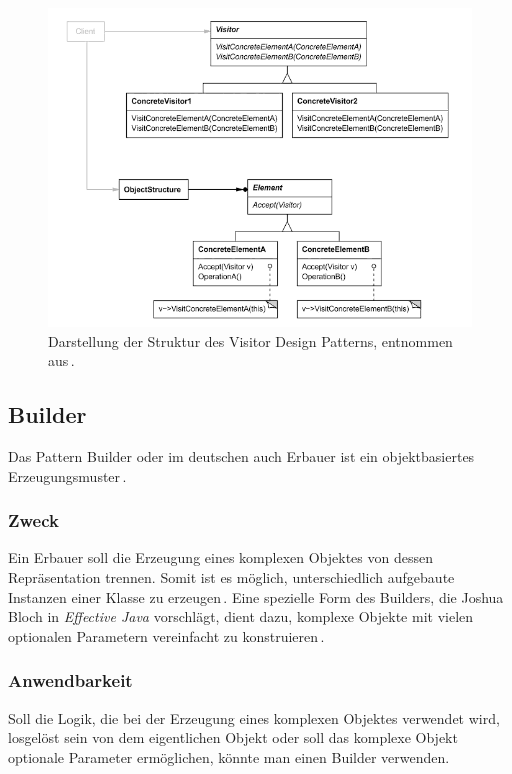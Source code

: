 \documentclass[12pt,oneside,a4paper,parskip]{scrbook}
\begin{document}
\begin{figure}[htbp]
	\centering
	\includegraphics[width=1.0\textwidth]{bilder/visitor}
	\caption{Darstellung der Struktur des Visitor Design Patterns, entnommen aus\,\cite[S.\,485]{gamma2015}.}
	\label{fig:visitor}
\end{figure}

\subsection{Builder}

Das Pattern Builder oder im deutschen auch Erbauer ist ein objektbasiertes Erzeugungsmuster\,\cite[S.\,159]{gamma2015}.

\subsubsection{Zweck}

Ein Erbauer soll die Erzeugung eines komplexen Objektes von dessen Repräsentation trennen. Somit ist es möglich, unterschiedlich aufgebaute Instanzen einer Klasse zu erzeugen\,\cite[S.\,159]{gamma2015}. Eine spezielle Form des Builders, die Joshua Bloch in \textit{Effective Java} vorschlägt, dient dazu, komplexe Objekte mit vielen optionalen Parametern vereinfacht zu konstruieren\,\cite[S.\,10ff.]{bloch2017}.

\subsubsection{Anwendbarkeit}

Soll die Logik, die bei der Erzeugung eines komplexen Objektes verwendet wird, losgelöst sein von dem eigentlichen Objekt oder soll das komplexe Objekt optionale Parameter ermöglichen, könnte man einen Builder verwenden.
\end{document}
